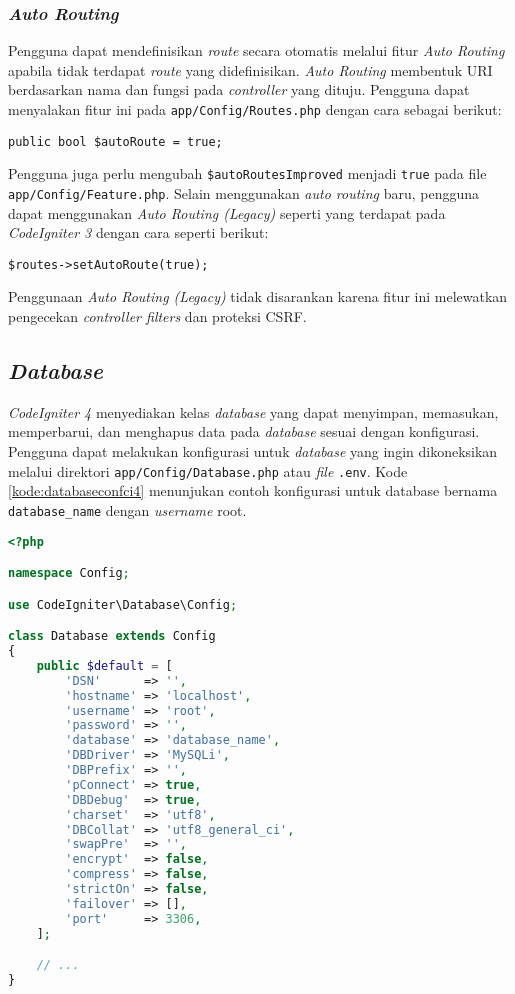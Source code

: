 \subsubsection{\textit{Auto Routing}}
\label{subsubsec:autorouting}
Pengguna dapat mendefinisikan \textit{route} secara otomatis melalui fitur \textit{Auto Routing} apabila tidak terdapat \textit{route} yang didefinisikan. \textit{Auto Routing} membentuk URI berdasarkan nama dan fungsi pada \textit{controller} yang dituju. Pengguna dapat menyalakan fitur ini pada \texttt{app/Config/Routes.php} dengan cara sebagai berikut:
\begin{center}
	\verb|public bool $autoRoute = true;|
\end{center}
Pengguna juga perlu mengubah \verb|$autoRoutesImproved| menjadi \verb|true| pada file \verb|app/Config/Feature.php|. Selain menggunakan \textit{auto routing} baru, pengguna dapat menggunakan \textit{Auto Routing (Legacy)} seperti yang terdapat pada \textit{CodeIgniter 3} dengan cara seperti berikut:
\begin{center}
\verb|$routes->setAutoRoute(true);|
\end{center}
Penggunaan \textit{Auto Routing (Legacy)} tidak disarankan karena fitur ini melewatkan pengecekan \textit{controller filters} dan proteksi CSRF.

\subsection{\textit{Database}}
\textit{CodeIgniter 4} menyediakan kelas \textit{database} yang dapat menyimpan, memasukan, memperbarui, dan menghapus data pada \textit{database} sesuai dengan konfigurasi. Pengguna dapat melakukan konfigurasi untuk \textit{database} yang ingin dikoneksikan melalui direktori \verb|app/Config/Database.php| atau \textit{file} \verb|.env|. Kode \ref{kode:databaseconfci4} menunjukan contoh konfigurasi untuk database bernama \verb|database_name| dengan \textit{username} root.

\begin{lstlisting}[language=PHP, caption=Contoh konfigurasi \textit{database} pada \textit{CodeIgniter 4}. ,label=kode:databaseconfci4]
<?php

namespace Config;

use CodeIgniter\Database\Config;

class Database extends Config
{
    public $default = [
        'DSN'      => '',
        'hostname' => 'localhost',
        'username' => 'root',
        'password' => '',
        'database' => 'database_name',
        'DBDriver' => 'MySQLi',
        'DBPrefix' => '',
        'pConnect' => true,
        'DBDebug'  => true,
        'charset'  => 'utf8',
        'DBCollat' => 'utf8_general_ci',
        'swapPre'  => '',
        'encrypt'  => false,
        'compress' => false,
        'strictOn' => false,
        'failover' => [],
        'port'     => 3306,
    ];

    // ...
}
\end{lstlisting}

